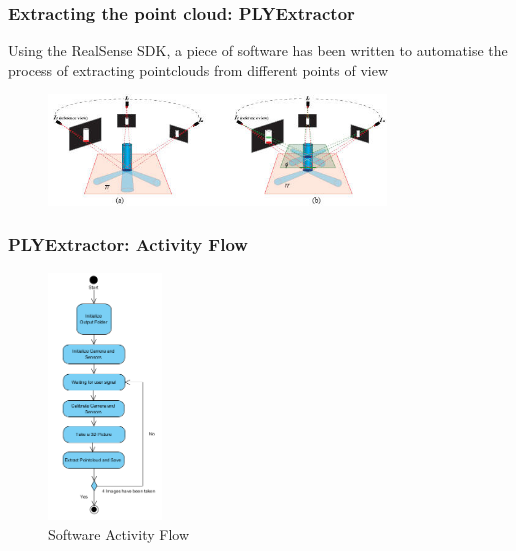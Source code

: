 \documentclass{beamer}
\begin{document}

\begin{frame}\frametitle{Extracting the point cloud: PLYExtractor}

Using the RealSense SDK, a piece of software has been written to automatise the process of extracting pointclouds from different points of view 

\begin{figure}	
\includegraphics[width=0.8\textwidth]{Figures/Resear10.jpg}
\label{fig:Reco}
\end{figure}

\end{frame}

\begin{frame}\frametitle{PLYExtractor: Activity Flow}

\begin{figure}	
\includegraphics[width=0.27\textwidth]{Figures/ActvityFlow.PNG}
\caption{Software Activity Flow}
\label{fig:ActivityFlow}
\end{figure}


\end{frame}
\end{document}
